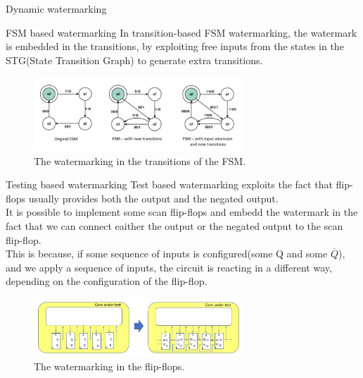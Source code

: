 \begin{section}{Dynamic watermarking}
\begin{subsection}{FSM based watermarking}
    In transition-based FSM watermarking, the watermark is embedded in the transitions, by exploiting
    free inputs from the states in the STG(State Transition Graph) to generate extra transitions.
    \begin{figure}[h]
      \centering
      \includegraphics[width=0.7\textwidth]{img/hardware/transition based watermarking.png}
      \caption{The watermarking in the transitions of the FSM.}
      \label{fig:FSMwm}
    \end{figure}
  \end{subsection}

  \begin{subsection}{Testing based watermarking}
    Test based watermarking exploits the fact that flip-flops usually provides both the output and the
    negated output.\\
    It is possible to implement some scan flip-flops and embedd the watermark in the fact that we can
    connect eaither the output or the negated output to the scan flip-flop.\\
    This is because, if some sequence of inputs is configured(some Q and some $\overline{Q}$), and we apply
    a sequence of inputs, the circuit is reacting in a different way, depending on the configuration of the
    flip-flop.\\
    \begin{figure}[H]
      \centering
      \includegraphics[width=0.7\textwidth]{img/hardware/testing based watermarking.png}
      \caption{The watermarking in the flip-flops.}
      \label{fig:flipflopwm}
    \end{figure}
  \end{subsection}
  

\end{section}
